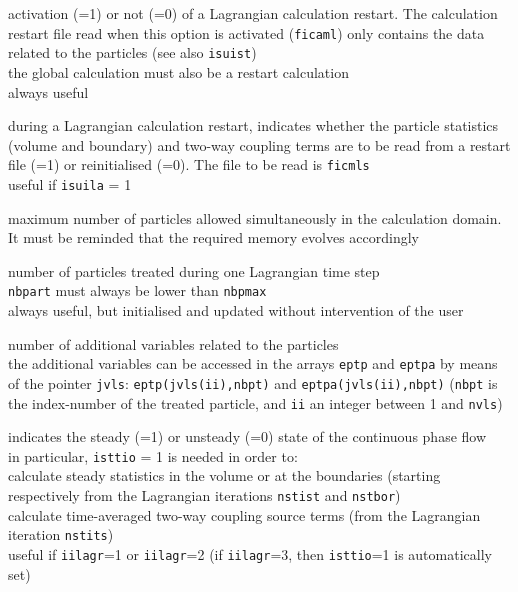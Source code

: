 {activation (=1) or not (=0) of a Lagrangian calculation restart.
The calculation restart file read when this option is activated (\texttt{ficaml})
only contains the data related to the particles (see also \texttt{isuist})\\
the global calculation must also be a restart calculation\\
always useful}

{during a Lagrangian calculation restart, indicates whether the particle
statistics (volume and boundary) and two-way coupling terms are to be read from
a restart file (=1) or reinitialised (=0). The file to be read is
\texttt{ficmls}\\
useful if \texttt{isuila} = 1}

{maximum number of particles allowed simultaneously in the calculation
domain. It must be reminded that the required memory evolves accordingly}

{number of particles treated during one Lagrangian time step\\
\texttt{nbpart} must always be lower than \texttt{nbpmax}\\
always useful, but initialised and updated without intervention of the user}

{number of additional variables related to the particles\\
the additional variables can be accessed in the arrays
\texttt{eptp} and \texttt{eptpa} by means of the
pointer \texttt{jvls}: \texttt{eptp(jvls(ii),nbpt)} and
\texttt{eptpa(jvls(ii),nbpt)} (\texttt{nbpt} is
the index-number of the treated particle, and \texttt{ii} an integer
between 1 and \texttt{nvls})}

{indicates the steady (=1) or unsteady (=0) state of the
continuous phase flow\\
in particular, \texttt{isttio} = 1 is needed in order to: \\
\hspace*{1cm}calculate steady statistics in the volume or at the boundaries
(starting respectively from the Lagrangian iterations \texttt{nstist} and
\texttt{nstbor}) \\
\hspace*{1cm}calculate time-averaged two-way coupling source terms (from the
Lagrangian iteration \texttt{nstits}) \\
useful if \texttt{iilagr}=1 or \texttt{iilagr}=2 (if \texttt{iilagr}=3,
then \texttt{isttio}=1 is automatically set)}

